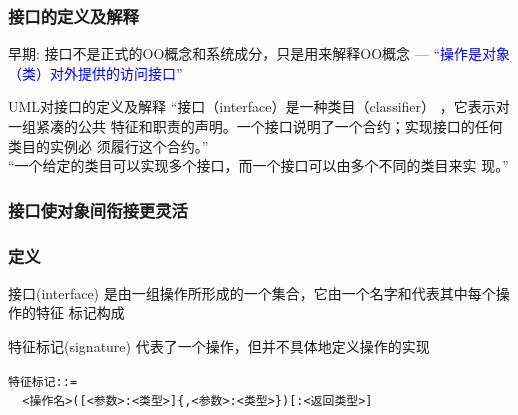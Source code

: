 \documentclass[compress]{beamer}
\begin{document}
  \begin{frame}
    \frametitle{接口的定义及解释}
    早期: 接口不是正式的OO概念和系统成分，只是用来解释OO概念 ---
    \textcolor{blue}{“操作是对象（类）对外提供的访问接口”}

    \begin{block}{UML对接口的定义及解释}
    “接口（interface）是一种类目（classifier） ，它表示对一组紧凑的公共
    特征和职责的声明。一个接口说明了一个合约；实现接口的任何类目的实例必
    须履行这个合约。” \\
    “一个给定的类目可以实现多个接口，而一个接口可以由多个不同的类目来实
    现。” 
  \end{block}
  \end{frame}

  \begin{frame}
    \frametitle{接口使对象间衔接更灵活}
     {
  }
     {
  }
  \end{frame}

  \begin{frame}
    \frametitle{定义}
    \begin{block}{接口(interface)}
      是由一组操作所形成的一个集合，它由一个名字和代表其中每个操作的特征
      标记构成
    \end{block}
    \begin{block}{特征标记(signature)}
      代表了一个操作，但并不具体地定义操作的实现 \\
    \end{block}
    \noindent \verb~特征标记::= ~ \\
    \noindent \verb~  <操作名>([<参数>:<类型>]{,<参数>:<类型>})[:<返回类型>]~
  \end{frame}
\end{document}
